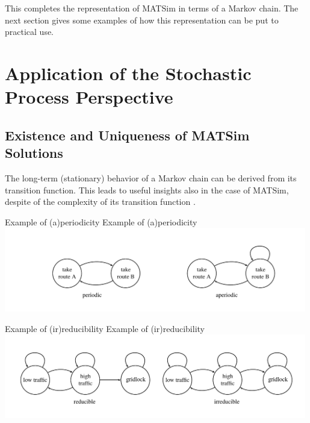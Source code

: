 This completes the representation of MATSim in terms of a Markov chain.
The next section gives some examples of how this representation
can be put to practical use.


\section{Application of the Stochastic Process Perspective}


\subsection{\label{sub:Existence-and-uniqueness}Existence and Uniqueness of
MATSim Solutions}

The long-term (stationary) behavior of a Markov chain can be derived
from its transition function. This leads to useful insights also in
the case of MATSim, despite of the complexity of its transition function
.

\createfigure%
{Example of (a)periodicity}%
{Example of (a)periodicity}%
{\label{fig:Example-of-(a)periodicity}}%
{\includegraphics[width=0.99\textwidth, angle=0]{understanding/figures/mc/fig1.pdf}}%
{}

\createfigure%
{Example of (ir)reducibility}%
{Example of (ir)reducibility}%
{\label{fig:Example-of-(ir)reducibility}}%
{\includegraphics[width=0.99\textwidth, angle=0]{understanding/figures/mc/fig2.pdf}}%
{}

